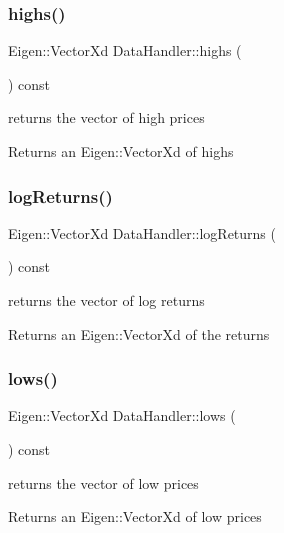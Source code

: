 \subsubsection{\texorpdfstring{highs()}{highs()}}
{\footnotesize\ttfamily Eigen\+::\+Vector\+Xd Data\+Handler\+::highs (\begin{DoxyParamCaption}{ }\end{DoxyParamCaption}) const}



returns the vector of high prices 

\begin{DoxyReturn}{Returns}
an Eigen\+::\+Vector\+Xd of highs 
\end{DoxyReturn}
\mbox{\label{classDataHandler_aed9c495d5134beaf1c796d5f828de229}} 
\subsubsection{\texorpdfstring{log\+Returns()}{logReturns()}}
{\footnotesize\ttfamily Eigen\+::\+Vector\+Xd Data\+Handler\+::log\+Returns (\begin{DoxyParamCaption}{ }\end{DoxyParamCaption}) const}



returns the vector of log returns 

\begin{DoxyReturn}{Returns}
an Eigen\+::\+Vector\+Xd of the returns 
\end{DoxyReturn}
\mbox{\label{classDataHandler_ad0b44f8a121372a519922feea6dd02e4}} 
\subsubsection{\texorpdfstring{lows()}{lows()}}
{\footnotesize\ttfamily Eigen\+::\+Vector\+Xd Data\+Handler\+::lows (\begin{DoxyParamCaption}{ }\end{DoxyParamCaption}) const}



returns the vector of low prices 

\begin{DoxyReturn}{Returns}
an Eigen\+::\+Vector\+Xd of low prices 
\end{DoxyReturn}
\mbox{\label{classDataHandler_af90bc55472239836a8d071710356ceb7}} 
